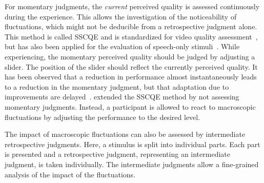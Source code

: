 For momentary judgments, the \emph{current} perceived quality is assessed continuously during the experience.
This allows the investigation of the noticeability of fluctuations, which might not be deducible from a retrospective judgment alone.
This method is called \ac{SSCQE} and is standardized for video quality assessment~\citep[][]{itu-r_recommendation_bt.500-13_methodology_2012}, but has also been applied for the evaluation of speech-only stimuli~\citep[\eg,][]{gros_instantaneous_2001}.
While experiencing, the momentary perceived quality should be judged by adjusting a slider.
The position of the slider should reflect the currently perceived quality.
It has been observed that a reduction in performance almost instantaneously leads to a reduction in the momentary judgment, but that adaptation due to improvements are delayed~\citep[\eg,][]{hands_recency_2001, gros_instantaneous_2001, hamberg_time-varying_1999}.
\citet{borowiak_long_2013} extended the \ac{SSCQE} method by not assessing momentary judgments.
Instead, a participant is allowed to react to macroscopic fluctuations by adjusting the performance to the desired level.

The impact of macroscopic fluctuations can also be assessed by intermediate retrospective judgments.
Here, a stimulus is split into individual parts.
Each part is presented and a retrospective judgment, representing an intermediate judgment, is taken individually.
The intermediate judgments allow a fine-grained analysis of the impact of the fluctuations.

